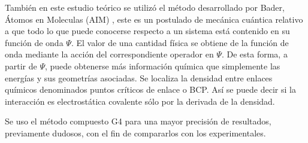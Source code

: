 También en este estudio teórico se utilizó el método desarrollado por Bader, Átomos en Moleculas (AIM) \cite{quimica6}, este es un postulado de mecánica cuántica relativo a que todo lo que puede conocerse respecto a un sistema está contenido en su función de onda $\Psi$. El valor de una cantidad física se obtiene de la función de onda mediante la acción del correspondiente operador en $\Psi$. De esta forma, a partir de $\Psi$, puede obtenerse más información química que simplemente las energías y sus geometrías asociadas.
Se localiza la densidad entre enlaces químicos denominados puntos críticos de enlace o BCP.
Así se puede decir si la interacción es electrostática covalente sólo por la derivada de la densidad.

Se uso el método compuesto G4 para una mayor precisión de resultados, previamente dudosos, con el fin de compararlos con los experimentales. \cite{quimica11}
 